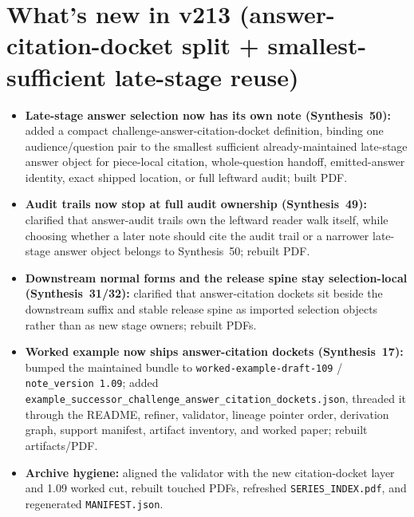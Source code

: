 \documentclass[11pt]{article}
\begin{document}
\section{What's new in v213 (answer-citation-docket split + smallest-sufficient late-stage reuse)}
\begin{itemize}[leftmargin=*]
\item \textbf{Late-stage answer selection now has its own note (Synthesis~50):} added a compact challenge-answer-citation-docket definition, binding one audience/question pair to the smallest sufficient already-maintained late-stage answer object for piece-local citation, whole-question handoff, emitted-answer identity, exact shipped location, or full leftward audit; built PDF.
\item \textbf{Audit trails now stop at full audit ownership (Synthesis~49):} clarified that answer-audit trails own the leftward reader walk itself, while choosing whether a later note should cite the audit trail or a narrower late-stage answer object belongs to Synthesis~50; rebuilt PDF.
\item \textbf{Downstream normal forms and the release spine stay selection-local (Synthesis~31/32):} clarified that answer-citation dockets sit beside the downstream suffix and stable release spine as imported selection objects rather than as new stage owners; rebuilt PDFs.
\item \textbf{Worked example now ships answer-citation dockets (Synthesis~17):} bumped the maintained bundle to \texttt{worked-example-draft-109} / \texttt{note\_version 1.09}; added \texttt{example\_successor\_challenge\_answer\_citation\_dockets.json}, threaded it through the README, refiner, validator, lineage pointer order, derivation graph, support manifest, artifact inventory, and worked paper; rebuilt artifacts/PDF.
\item \textbf{Archive hygiene:} aligned the validator with the new citation-docket layer and 1.09 worked cut, rebuilt touched PDFs, refreshed \texttt{SERIES\_INDEX.pdf}, and regenerated \texttt{MANIFEST.json}.
\end{itemize}
\end{document}
